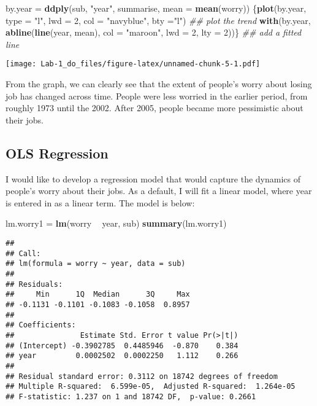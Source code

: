 \documentclass[]{article}
\newenvironment{Shaded}{\begin{snugshade}}{\end{snugshade}}
\newcommand{\CommentTok}[1]{\textcolor[rgb]{0.56,0.35,0.01}{\textit{#1}}}
\newcommand{\DataTypeTok}[1]{\textcolor[rgb]{0.13,0.29,0.53}{#1}}
\newcommand{\DecValTok}[1]{\textcolor[rgb]{0.00,0.00,0.81}{#1}}
\newcommand{\KeywordTok}[1]{\textcolor[rgb]{0.13,0.29,0.53}{\textbf{#1}}}
\newcommand{\NormalTok}[1]{#1}
\newcommand{\OperatorTok}[1]{\textcolor[rgb]{0.81,0.36,0.00}{\textbf{#1}}}
\newcommand{\StringTok}[1]{\textcolor[rgb]{0.31,0.60,0.02}{#1}}
\begin{document}
\begin{Shaded}
\begin{Highlighting}[]
\NormalTok{by.year =}\StringTok{ }\KeywordTok{ddply}\NormalTok{(sub, }\StringTok{"year"}\NormalTok{, summarise, }\DataTypeTok{mean =} \KeywordTok{mean}\NormalTok{(worry))}
\NormalTok{\{}\KeywordTok{plot}\NormalTok{(by.year, }\DataTypeTok{type =} \StringTok{"l"}\NormalTok{, }\DataTypeTok{lwd =} \DecValTok{2}\NormalTok{, }\DataTypeTok{col =} \StringTok{"navyblue"}\NormalTok{, }\DataTypeTok{bty =}\StringTok{"l"}\NormalTok{) }\CommentTok{## plot the trend}
\KeywordTok{with}\NormalTok{(by.year, }\KeywordTok{abline}\NormalTok{(}\KeywordTok{line}\NormalTok{(year, mean), }\DataTypeTok{col =} \StringTok{"maroon"}\NormalTok{, }\DataTypeTok{lwd =} \DecValTok{2}\NormalTok{, }\DataTypeTok{lty =} \DecValTok{2}\NormalTok{))\} }\CommentTok{## add a fitted line }
\end{Highlighting}
\end{Shaded}

\texttt{[image: Lab-1\_do\_files/figure-latex/unnamed-chunk-5-1.pdf]}

From the graph, we can clearly see that the extent of people's worry
about losing job has changed across time. People were less worried in
the earlier period, from roughly 1973 until the 2002. After 2005, people
became more pessimistic about their jobs.

\hypertarget{ols-regression}{%
\subsection{OLS Regression}\label{ols-regression}}

I would like to develop a regression model that would capture the
dynamics of people's worry about their jobs. As a default, I will fit a
linear model, where year is entered in as a linear term. The model is
below:

\begin{Shaded}
\begin{Highlighting}[]
\NormalTok{lm.worry1 =}\StringTok{ }\KeywordTok{lm}\NormalTok{(worry }\OperatorTok{~}\StringTok{ }\NormalTok{year, sub)}
\KeywordTok{summary}\NormalTok{(lm.worry1)}
\end{Highlighting}
\end{Shaded}

\begin{verbatim}
## 
## Call:
## lm(formula = worry ~ year, data = sub)
## 
## Residuals:
##     Min      1Q  Median      3Q     Max 
## -0.1131 -0.1101 -0.1083 -0.1058  0.8957 
## 
## Coefficients:
##               Estimate Std. Error t value Pr(>|t|)
## (Intercept) -0.3902785  0.4485946  -0.870    0.384
## year         0.0002502  0.0002250   1.112    0.266
## 
## Residual standard error: 0.3112 on 18742 degrees of freedom
## Multiple R-squared:  6.599e-05,  Adjusted R-squared:  1.264e-05 
## F-statistic: 1.237 on 1 and 18742 DF,  p-value: 0.2661
\end{verbatim}
\end{document}

